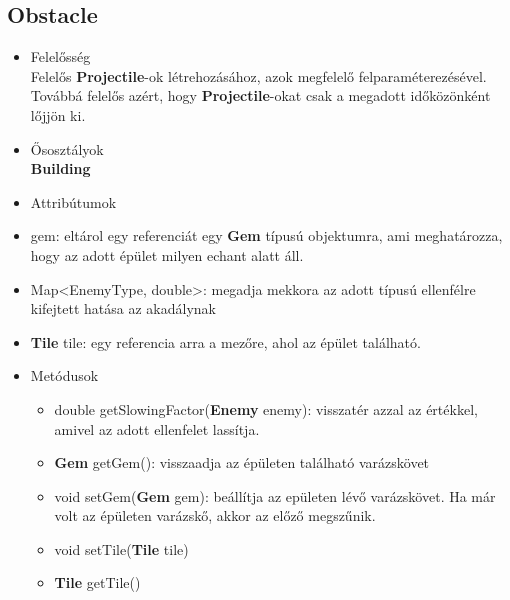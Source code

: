\subsection{Obstacle}
\begin{itemize}
\item Felelősség\\
Felelős \textbf{Projectile}-ok létrehozásához, azok megfelelő felparaméterezésével. Továbbá felelős azért, hogy \textbf{Projectile}-okat csak a megadott időközönként lőjjön ki.
\item Ősosztályok\\
\textbf{Building}
\item Attribútumok\\
		\item gem: eltárol egy referenciát egy \textbf{Gem} típusú objektumra, ami meghatározza, hogy az adott épület milyen echant alatt áll.
		\item Map<EnemyType, double>: megadja mekkora az adott típusú ellenfélre kifejtett hatása az akadálynak
		\item \textbf{Tile} tile: egy referencia arra a mezőre, ahol az épület található.
\item Metódusok
	\begin{itemize}
		\item double getSlowingFactor(\textbf{Enemy} enemy): visszatér azzal az értékkel, amivel az adott ellenfelet lassítja.
		\item \textbf{Gem} getGem(): visszaadja az épületen található varázskövet
		\item void setGem(\textbf{Gem} gem): beállítja az epületen lévő varázskövet. Ha már volt az épületen varázskő, akkor az előző megszűnik.
		\item void setTile(\textbf{Tile} tile)
		\item \textbf{Tile} getTile()
	\end{itemize}
\end{itemize}

